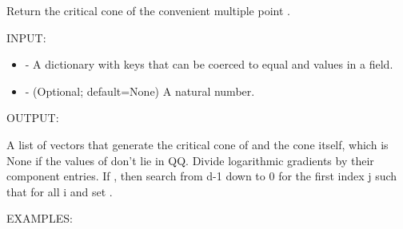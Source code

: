 \documentclass[letterpaper,12pt,openany,oneside]{sphinxmanual}
\begin{document}
\begin{fulllineitems}
\begin{fulllineitems}
\begin{itemize}
\begin{description}
\end{description}

\end{itemize}

\end{fulllineitems}


\begin{fulllineitems}
\label{amgf:amgf.FFPD.critical_cone}
Return the critical cone of the convenient multiple point .

INPUT:
\begin{itemize}
\item {} 
 - A dictionary with keys that can be coerced to equal
 and values in a field.

\item {} 
 - (Optional; default=None) A natural number.

\end{itemize}

OUTPUT:

A list of vectors that generate the critical cone of  and
the cone itself, which is None if the values of  don't lie in QQ.
Divide logarithmic gradients by their component  entries.
If , then search from d-1 down to 0 for the
first index j such that for all i 
and set .

EXAMPLES:


\end{fulllineitems}
\end{fulllineitems}
\end{document}
